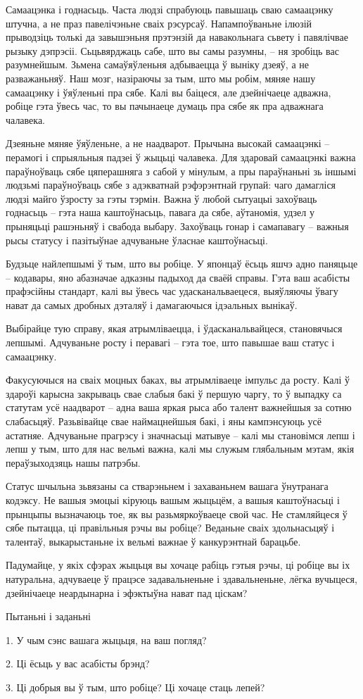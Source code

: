 Самаацэнка і годнасьць. Часта людзі спрабуюць павышаць сваю самаацэнку штучна, а не праз павелічэньне сваіх рэсурсаў. Напампоўваньне ілюзій прыводзіць толькі да завышэньня прэтэнзій да навакольнага сьвету і павялічвае рызыку дэпрэсіі. Сьцьвярджаць сабе, што вы самы разумны, – ня зробіць вас разумнейшым. Зьмена самаўяўленьня адбываецца ў выніку дзеяў, а не разважаньняў. Наш мозг, назіраючы за тым, што мы робім, мяняе нашу самаацэнку і ўяўленьні пра сябе. Калі вы баіцеся, але дзейнічаеце адважна, робіце гэта ўвесь час, то вы пачынаеце думаць пра сябе як пра адважнага чалавека.

Дзеяньне мяняе ўяўленьне, а не наадварот. Прычына высокай самаацэнкі – перамогі і спрыяльныя падзеі ў жыцьці чалавека. Для здаровай самаацэнкі важна параўноўваць сябе цяперашняга з сабой у мінулым, а пры параўнаньні зь іншымі людзьмі параўноўваць сябе з адэкватнай рэфэрэнтнай групай: чаго дамагліся людзі майго ўзросту за гэты тэрмін. Важна ў любой сытуацыі захоўваць годнасьць – гэта наша каштоўнасьць, павага да сябе, аўтаномія, удзел у прыняцьці рашэньняў і свабода выбару. Захоўваць гонар і самапавагу – важныя рысы статусу і пазітыўнае адчуваньне ўласнае каштоўнасьці.

Будзьце найлепшымі ў тым, што вы робіце. У японцаў ёсьць яшчэ адно паняцьце – кодавары, яно абазначае адказны падыход да сваёй справы. Гэта ваш асабісты прафэсійны стандарт, калі вы ўвесь час удасканальваецеся, выяўляючы ўвагу нават да самых дробных дэталяў і дамагаючыся ідэальных вынікаў.

Выбірайце тую справу, якая атрымліваецца, і ўдасканальвайцеся, становячыся лепшымі. Адчуваньне росту і перавагі – гэта тое, што павышае ваш статус і самаацэнку.

Факусуючыся на сваіх моцных баках, вы атрымліваеце імпульс да росту. Калі ў здароўі карысна закрываць свае слабыя бакі ў першую чаргу, то ў выпадку са статутам усё наадварот – адна ваша яркая рыса або талент важнейшыя за сотню слабасьцяў. Разьвівайце свае наймацнейшыя бакі, і яны кампэнсуюць усё астатняе. Адчуваньне прагрэсу і значнасьці матывуе – калі мы становімся лепш і лепш у тым, што для нас вельмі важна, калі мы служым глябальным мэтам, якія пераўзыходзяць нашы патрэбы.

Статус шчыльна зьвязаны са стварэньнем і захаваньнем вашага ўнутранага кодэксу. Не вашыя эмоцыі кіруюць вашым жыцьцём, а вашыя каштоўнасьці і прынцыпы вызначаюць тое, як вы разьмяркоўваеце свой час. Не стамляйцеся ў сябе пытацца, ці правільныя рэчы вы робіце? Веданьне сваіх здольнасьцяў і талентаў, выкарыстаньне іх вельмі важнае ў канкурэнтнай барацьбе.

Падумайце, у якіх сфэрах жыцьця вы хочаце рабіць гэтыя рэчы, ці робіце вы іх натуральна, адчуваеце ў працэсе задавальненьне і здавальненьне, лёгка вучыцеся, дзейнічаеце неардынарна і эфэктыўна нават пад ціскам?

Пытаньні і заданьні

1. У чым сэнс вашага жыцьця, на ваш погляд?

2. Ці ёсьць у вас асабісты брэнд?

3. Ці добрыя вы ў тым, што робіце? Ці хочаце стаць лепей?

